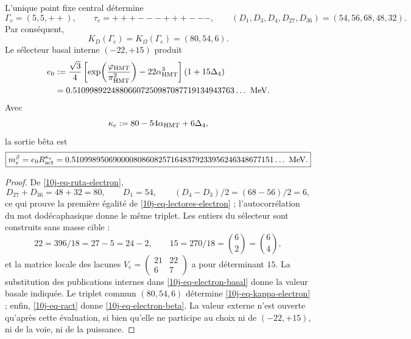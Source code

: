 \begin{theorem}
\label{10j-thm-electron}
L'unique point fixe central détermine
\begin{equation}
 \Gamma_e=(5,5,++),
 \qquad \tau_e=+++---+++---,
 \qquad
 (D_1,D_3,D_4,D_{27},D_{36})=(54,56,68,48,32).
 \label{10j-eq-ruta-electron}
\end{equation}
Par conséquent,
\begin{equation}
 K_D(\Gamma_e)=K_\Omega(\Gamma_e)=(80,54,6).
 \label{10j-eq-lectores-electron}
\end{equation}
Le sélecteur basal interne \((-22,+15)\) produit
\begin{equation}
\begin{aligned}
 e_0&:=\frac{\sqrt3}{4}
 \left[
  \exp\!\left(\frac{\varphi_{\rm HMT}}{\pi_{\rm HMT}^2}\right)
  -22\alpha_{\rm HMT}^3
 \right](1+15\Delta_4)\\
 &=0.51099892248806607250987087719134943763\ldots\ {\rm MeV}.
\end{aligned}
 \label{10j-eq-electron-basal}
\end{equation}
Avec
\begin{equation}
 \kappa_e:=80-54\alpha_{\rm HMT}+6\Delta_4,
 \label{10j-eq-kappa-electron}
\end{equation}
la sortie bêta est
\begin{equation}
 \boxed{
 m_e^\beta=e_0R_{\rm act}^{\kappa_e}
 =0.5109989506900008086082571648379233956246348677151\ldots\ {\rm MeV}.}
 \label{10j-eq-electron-beta}
\end{equation}
\end{theorem}

\begin{proof}
De \eqref{10j-eq-ruta-electron},
\[
 D_{27}+D_{36}=48+32=80,
 \qquad D_1=54,
 \qquad (D_4-D_3)/2=(68-56)/2=6,
\]
ce qui prouve la première égalité de \eqref{10j-eq-lectores-electron} ; l'autocorrélation du mot dodécaphasique donne le même triplet. Les entiers du sélecteur sont construits sans masse cible :
\begin{equation}
 22=396/18=27-5=24-2,
 \qquad 15=270/18=\binom62=\binom64,
 \label{10j-eq-genealogia-22-15}
\end{equation}
et la matrice locale des lacunes \(
 V_e=\left(\begin{smallmatrix}21&22\\6&7\end{smallmatrix}\right)
\)
a pour déterminant \(15\). La substitution des publications internes dans \eqref{10j-eq-electron-basal} donne la valeur basale indiquée. Le triplet commun \((80,54,6)\) détermine \eqref{10j-eq-kappa-electron} ; enfin, \eqref{10j-eq-ract} donne \eqref{10j-eq-electron-beta}. La valeur externe n'est ouverte qu'après cette évaluation, si bien qu'elle ne participe au choix ni de \((-22,+15)\), ni de la voie, ni de la puissance.
\end{proof}

